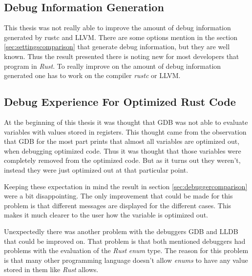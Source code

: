 



\subsection{Debug Information Generation}
This thesis was not really able to improve the amount of debug information generated by \gls{rustc} and \gls{LLVM}.
There are some options mention in the section \ref{sec:settingscomparison} that generate debug information, but they are well known.
Thus the result presented there is noting new for most developers that program in \emph{Rust}.
To really improve on the amount of debug information generated one has to work on the compiler \emph{rustc} or \gls{LLVM}.


\subsection{Debug Experience For Optimized Rust Code}
At the beginning of this thesis it was thought that \gls{GDB} was not able to evaluate variables with values stored in registers.
This thought came from the observation that \gls{GDB} for the most part prints that almost all variables are optimized out,  when debugging optimized code.
Thus it was thought that those variables were completely removed from the optimized code.
But as it turns out they weren't, instead they were just optimized out at that particular point.


Keeping these expectation in mind the result in section \ref{sec:debuggercomparison} were a bit disappointing.
The only improvement that could be made for this problem is that different messages are displayed for the different cases.
This makes it much clearer to the user how the variable is optimized out.


Unexpectedly there was another problem with the debuggers \gls{GDB} and \gls{LLDB} that could be improved on.
That problem is that both mentioned debuggers had problems with the evaluation of the \emph{Rust} \emph{enum} type.
The reason for this problem is that many other programming language doesn't allow \emph{enums} to have any value stored in them like \emph{Rust} allows.


